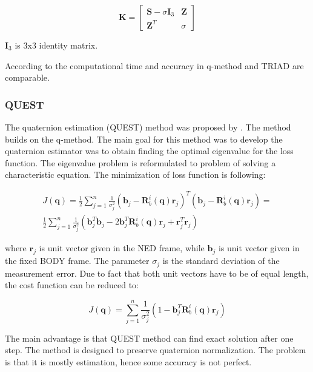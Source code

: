 \documentclass[12pt,a4paper,oneside]{article}
\begin{document}
\begin{equation}
\bm{K} = \begin{bmatrix}
\bm{S} - \sigma\bm{I}_3 & \bm{Z} \\
\bm{Z}^T & \sigma
\end{bmatrix}
\end{equation}

$\bm{I}_3$ is 3x3 identity matrix.

According to \cite{ccelik2013comparison} the computational time and accuracy in q-method and TRIAD are comparable.

\subsubsection{QUEST}

The quaternion estimation (QUEST) method  was proposed by \citet{shuster1978approximate}. The method builds on the q-method. The main goal for this method was to develop the quaternion estimator was to obtain finding the optimal eigenvalue for the loss function. The eigenvalue problem is reformulated to problem of solving a characteristic equation. The minimization of loss function is following:

\begin{equation}
\begin{split}
J(\bm{q}) = \frac{1}{2}\sum_{j=1}^n\frac{1}{\sigma_j^2}(\bm{b}_j - \bm{R}_b^i(\bm{q})\bm{r}_j)^T(\bm{b}_j - \bm{R}_b^i(\bm{q})\bm{r}_j) = \\
\frac{1}{2}\sum_{j=1}^n\frac{1}{\sigma_j^2}(\bm{b}_j^T\bm{b}_j - 2\bm{b}_j^T\bm{R}_b^i(\bm{q})\bm{r}_j + \bm{r}_j^T\bm{r}_j)
\end{split}
\end{equation}

where $\bm{r}_j$ is unit vector given in the NED frame, while $\bm{b}_j$ is unit vector given in the fixed BODY frame. The parameter $\sigma_j$ is the standard deviation of the measurement error. Due to fact that both unit vectors have to be of equal length, the cost function can be reduced to:

\begin{equation}
J(\bm{q}) = \sum_{j=1}^n\frac{1}{\sigma_j^2}(1 - \bm{b}_j^T\bm{R}_b^i(\bm{q})\bm{r}_j)
\end{equation}


The main advantage is that QUEST method can find exact solution after one step. The method is designed to preserve quaternion normalization. The problem is that it is mostly estimation, hence some accuracy is not perfect.
\end{document}
